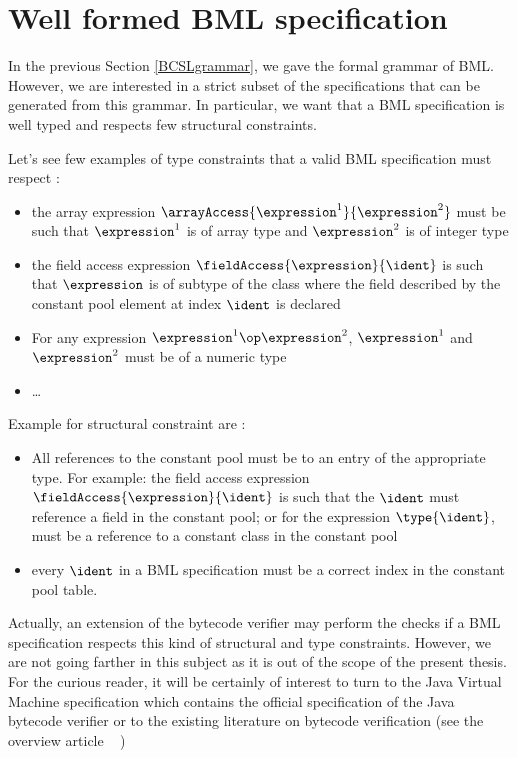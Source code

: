 
\newcommand{\getType}{\mbox{\rm\textsf{getType}}}
\newcommand{\constType}{\mbox{\rm\textsf{constType}}}
\newcommand{\getClass}{\mbox{\rm\textsf{getClass}}}
\newcommand{\application}{\mbox{\rm\textbf{CLS}}}
 
\section{Well formed BML specification}
In the previous Section \ref{BCSLgrammar}, we gave the formal grammar of BML.
However, we are interested in a strict subset of 
the specifications that can be generated from this grammar. In particular, we want that a
BML specification is well typed and respects few structural constraints.


Let's see few examples of type constraints that  a valid BML specification must respect : 
\begin{itemize}
    \item  the array expression $\arrayAccess{\expression^1}{\expression^2}$ must be such that 
$\expression^1$ is of array type and $\expression^2$  is of integer type
    \item the field access expression  $\fieldAccess{\expression}{\ident}$ is such that $\expression$ is of subtype
    of the class where the field described by the constant pool element at index $\ident$ is declared
    \item For any expression $ \expression^1 \op \expression^2$,  $ \expression^1$ and $ \expression^2$ must be of
          a numeric type
    
    \item \ldots
\end{itemize}

Example for structural constraint are :
\begin{itemize}
    \item All references to the constant pool must be to an entry of the appropriate type. For example:
          the field access expression  $\fieldAccess{\expression}{\ident}$ is such that the
	  $\ident$ must reference a field in the constant pool; or for the expression $\type{\ident}$, \ident
	  must be a reference to a constant class in the constant pool
    \item every $\ident$ in a BML specification must be a correct index in the constant pool table. 
    
\end{itemize}

Actually, an extension of the bytecode verifier may perform the checks
 if a BML specification  respects this kind of structural and type constraints.
However, we are not going farther in this subject as it is out of the scope of the present thesis.
For the curious reader, it will be certainly of interest to turn to the Java Virtual Machine specification \cite{VMSpec} which contains the official
 specification of the Java bytecode verifier    
or to the existing literature on bytecode verification (see the overview article ~\cite{Ljbc} )
 







